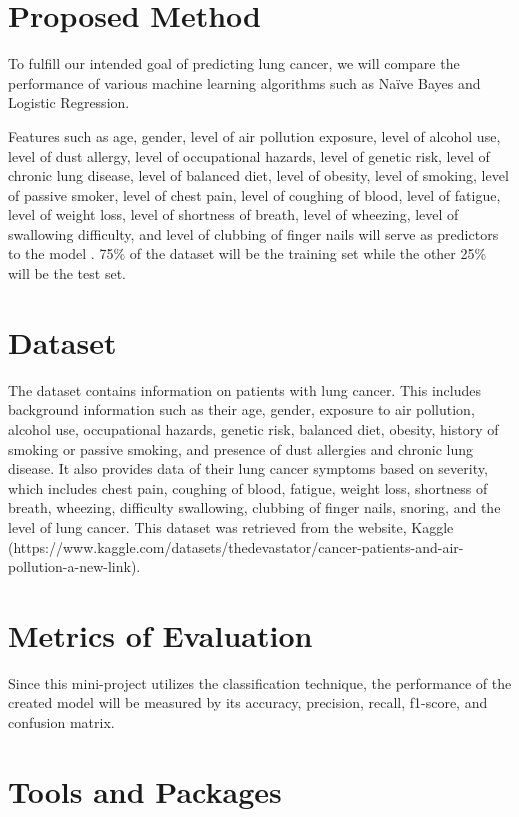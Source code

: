 \documentclass[runningheads]{llncs}
\begin{document}
\section{Proposed Method}

To fulfill our intended goal of predicting lung cancer, we will compare the performance of various machine learning algorithms such as Naïve Bayes and Logistic Regression. 

Features such as age, gender, level of air pollution exposure, level of alcohol use, level of dust allergy, level of occupational hazards, level of genetic risk, level of chronic lung disease, level of balanced diet, level of obesity, level of smoking, level of passive smoker, level of chest pain, level of coughing of blood, level of fatigue, level of weight loss, level of shortness of breath, level of wheezing, level of swallowing difficulty, and level of clubbing of finger nails will serve as predictors to the model \cite{devastator2022}. 75\% of the dataset will be the training set while the other 25\% will be the test set.

\section{Dataset}

The dataset contains information on patients with lung cancer. This includes background information such as their age, gender, exposure to air pollution, alcohol use, occupational hazards, genetic risk, balanced diet, obesity, history of smoking or passive smoking, and presence of dust allergies and chronic lung disease. It also provides data of their lung cancer symptoms based on severity, which includes chest pain, coughing of blood, fatigue, weight loss, shortness of breath, wheezing, difficulty swallowing, clubbing of finger nails, snoring, and the level of lung cancer. This dataset was retrieved from the website, Kaggle (https://www.kaggle.com/datasets/thedevastator/cancer-patients-and-air-pollution-a-new-link). 

\section{Metrics of Evaluation}

Since this mini-project utilizes the classification technique, the performance of the created model will be measured by its accuracy, precision, recall, f1-score, and confusion matrix.

\section{Tools and Packages}
\end{document}
